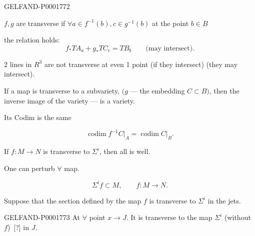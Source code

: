 


\begin{GelfandAdjacentEvidence}{GELFAND-P000177}{2}
\end{GelfandAdjacentEvidence}

$f, g$ are transverse if $\forall a\in f^{-1}(b), c\in g^{-1}(b)$ at the point $b\in B$

the relation holds:
\begin{equation*}f_*TA_a+g_*TC_c=TB_b\qquad\text{(may intersect).}\end{equation*}

2 lines in $R^3$ are not transverse at even 1 point (if they intersect) (they may intersect).

If a map is transverse to a subvariety, $(g$ — the embedding $C\subset B)$, then the inverse image of the variety — is a variety.

Its Codim is the same

\begin{equation*}\operatorname{codim}f^{-1}C\big|_A=\operatorname{codim}C\big|_B.\end{equation*}

If $f: M\longrightarrow N$ is transverse to $\Sigma^i$, then all is well.

One can perturb $\forall$ map.


\begin{equation*}\Sigma^i f\subset M,\qquad f: M\longrightarrow N.\end{equation*}

Suppose that the section defined by the map $f$ is transverse to $\Sigma^i$ in the jets.

\begin{GelfandAdjacentEvidence}{GELFAND-P000177}{3}
At $\forall$ point $x\longrightarrow J$. It is transverse to the map $\Sigma^i$ (without $f$)\, [?] in $J$.
\end{GelfandAdjacentEvidence}

